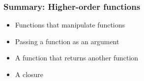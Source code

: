 \documentclass[14pt,compress,aspectratio=169]{beamer}
\begin{document}
\begin{frame}[fragile]
  \frametitle{Summary: Higher-order functions}
  \begin{itemize}
  \item Functions that manipulate functions
  \item Passing a function as an argument
  \item A function that returns another function
  \item A closure
  \end{itemize}
\end{frame}
\end{document}
